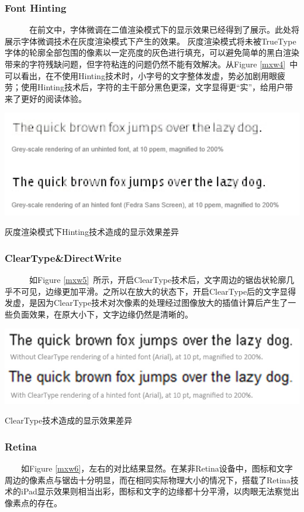 \documentclass[a4paper]{article}
\begin{document}
\subsubsection{Font Hinting}

~~~~~~在前文中，字体微调在二值渲染模式下的显示效果已经得到了展示。此处将展示字体微调技术在灰度渲染模式下产生的效果。
灰度渲染模式将未被TrueType字体的轮廓全部包围的像素以一定亮度的灰色进行填充，可以避免简单的黑白渲染带来的字符残缺问题，但字符粘连的问题仍然不能有效解决。从Figure \ref{mxw4}~中可以看出，在不使用Hinting技术时，小字号的文字整体发虚，势必加剧用眼疲劳；使用Hinting技术后，字符的主干部分黑色更深，文字显得更“实”，给用户带来了更好的阅读体验。

\makeatletter
\def\@captype{figure}
\makeatother
\centerline{\includegraphics [width=1\textwidth]{mxw4.png} }
\caption{灰度渲染模式下Hinting技术造成的显示效果差异}
\label{mxw4}

\subsubsection{ClearType\&DirectWrite}

~~~~~~如Figure \ref{mxw5}~所示，开启ClearType技术后，文字周边的锯齿状轮廓几乎不可见，边缘更加平滑。之所以在放大的状态下，开启ClearType后的文字显得发虚，是因为ClearType技术对次像素的处理经过图像放大的插值计算后产生了一些负面效果，在原大小下，文字边缘仍然是清晰的。

\makeatletter
\def\@captype{figure}
\makeatother
\centerline{\includegraphics [width=1\textwidth]{mxw5.png} }
\caption{ ClearType技术造成的显示效果差异}
\label{mxw5}

\subsubsection{Retina}
~~~~如Figure \ref{mxw6}，左右的对比结果显然。在某非Retina设备中，图标和文字周边的像素点与锯齿十分明显，而在相同实际物理大小的情况下，搭载了Retina技术的iPad显示效果则相当出彩，图标和文字的边缘都十分平滑，以肉眼无法察觉出像素点的存在。
\end{document}
